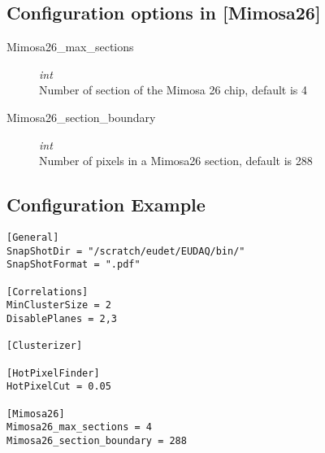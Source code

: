 \subsection{Configuration options in [Mimosa26]}
\begin{description}
\item[Mimosa26\_max\_sections] {\it int} \\
Number of section of the Mimosa 26 chip, default is 4   
\item[Mimosa26\_section\_boundary] {\it int} \\ 
Number of pixels in a Mimosa26 section, default is 288
\end{description}

\subsection{Configuration Example}
\begin{verbatim}
[General]
SnapShotDir = "/scratch/eudet/EUDAQ/bin/"
SnapShotFormat = ".pdf"

[Correlations]
MinClusterSize = 2
DisablePlanes = 2,3

[Clusterizer]

[HotPixelFinder]
HotPixelCut = 0.05

[Mimosa26]
Mimosa26_max_sections = 4 
Mimosa26_section_boundary = 288
\end{verbatim}
